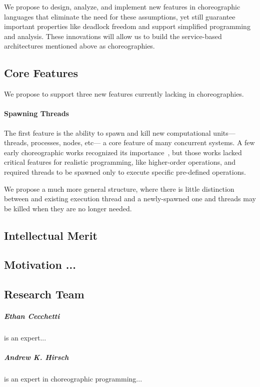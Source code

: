 We propose to design, analyze, and implement new features in choreographic languages that eliminate the need for these assumptions,
yet still guarantee important properties like deadlock freedom and support simplified programming and analysis.
These innovations will allow us to build the service-based architectures mentioned above as choreographies.

\subsection{Core Features}
We propose to support three new features currently lacking in choreographies.

\paragraph{Spawning Threads}
The first feature is the ability to spawn and kill new computational units---threads, processes, nodes, etc---%
a core feature of many concurrent systems.
A few early choreographic works recognized its importance~\citep{CarboneM13,CruzFilipeM16a},
but those works lacked critical features for realistic programming, like higher-order operations,
and required threads to be spawned only to execute specific pre-defined operations.

We propose a much more general structure, where there is little distinction between
and existing execution thread and a newly-spawned one and threads may be killed when they are no longer needed.


\subsection{Intellectual Merit}


\subsection{Motivation ...}
\label{sec:motivation}


\subsection{Research Team}

\subparagraph{Ethan Cecchetti} is an expert...

\subparagraph{Andrew K. Hirsch} is an expert in choreographic programming...

